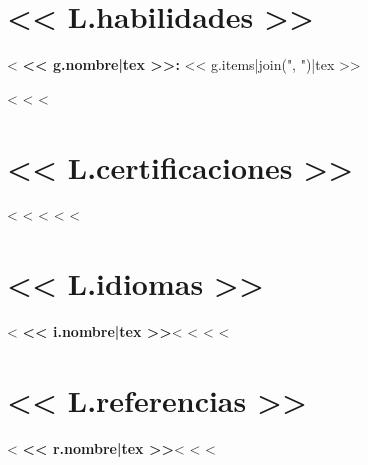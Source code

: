 \documentclass[9pt,a4paper]{extarticle}
\begin{document}
\section*{<< L.habilidades >>}
<%
\textbf{<< g.nombre|tex >>:} << g.items|join(", ")|tex >>

<%
<%
<%

\section*{<< L.certificaciones >>}
<%
<%
<%
<%
<%

\section*{<< L.idiomas >>}
<%
\textbf{<< i.nombre|tex >>}<%
<%
<%
<%

\section*{<< L.referencias >>}
<%
\textbf{<< r.nombre|tex >>}<%
<%
<%
\end{document}
